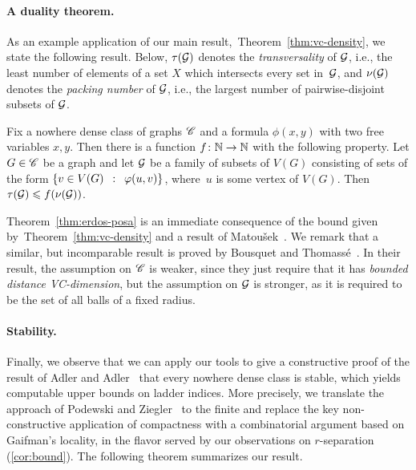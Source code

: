 \paragraph{A duality theorem.}
As an example application of our main result,~Theorem~\ref{thm:vc-density}, we state the following
 result. Below, $\tau(\cal G)$ denotes the \emph{transversality} of $\cal G$, i.e., the least number of elements of a set $X$ which intersects every set in~$\cal G$,
and $\nu(\cal G)$ denotes the \emph{packing number} of $\cal G$, i.e., the largest number of pairwise-disjoint subsets of $\cal G$.
 
\begin{theorem}\label{thm:erdos-posa}
	Fix a nowhere dense class of graphs $\CCC$ and a 
	formula $\phi(x,y)$ with two free variables $x,y$.
	Then there is a function $f\from \N\to\N$ with the following property.
	Let $G\in \CCC$ be a graph and let $\cal G$
	be a family of subsets of $V(G)$ consisting of sets of the form $\setof{v\in V(G)}{\phi(u, v)}$, where~$u$ is some vertex of $V(G)$.
Then~$\tau({\cal G})\le f(\nu(\cal G))$.
\end{theorem}

Theorem~\ref{thm:erdos-posa} is an immediate consequence of the bound given by~Theorem~\ref{thm:vc-density} and a result of Matou{\v s}ek~\cite{Matousek:2004:BVI:1005787.1005789}.
%
We remark that a similar, but incomparable result
is proved by Bousquet and Thomass{\'e}~\cite{BousquetT15}.
In their result, the assumption on $\CCC$ is weaker, since they just require that it has \emph{bounded distance VC-dimension}, 
but the assumption on   $\cal G$ is stronger, as it is required to be the set of all balls of a fixed radius.





\paragraph{Stability.}
Finally, we observe that we can apply our  tools to give a constructive proof of the result of Adler and Adler~\cite{adler2014interpreting}
that every nowhere dense class is stable, which yields computable upper bounds on ladder indices.
More precisely, we translate the approach of Podewski and Ziegler~\cite{podewski1978stable} to the finite
and replace the key non-constructive application of compactness with a combinatorial argument based on Gaifman's locality,
in the flavor served by our observations on $r$-separation (\autoref{cor:bound}).
The following theorem summarizes our result.

